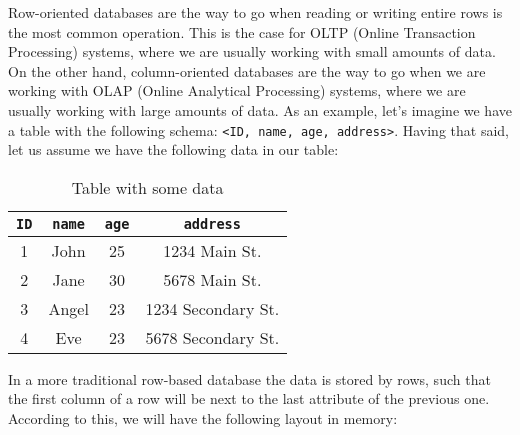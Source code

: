 Row-oriented databases are the way to go when reading or writing entire rows is the most common operation. This is the case for OLTP (Online Transaction Processing) systems, where we are usually working with small amounts of data. On the other hand, column-oriented databases are the way to go when we are working with OLAP (Online Analytical Processing) systems, where we are usually working with large amounts of data. As an example, let's imagine we have a table with the following schema: \texttt{<ID, name, age, address>}. Having that said, let us assume we have the following data in our table:

\begin{table}[ht]
    \centering
    \begin{tabular}{|c|c|c|c|}
        \hline
        \rowcolor[HTML]{C0C0C0}
        \texttt{ID} & \texttt{name} & \texttt{age} & \texttt{address}   \\ \hline
        1           & John          & 25           & 1234 Main St.      \\ \hline
        2           & Jane          & 30           & 5678 Main St.      \\ \hline
        3           & Angel         & 23           & 1234 Secondary St. \\ \hline
        4           & Eve           & 23           & 5678 Secondary St. \\ \hline
    \end{tabular}
    \caption{Table with some data}
\end{table}

In a more traditional row-based database the data is stored by rows, such that the first column of a row will be next to the last attribute of the previous one. According to this, we will have the following layout in memory:

